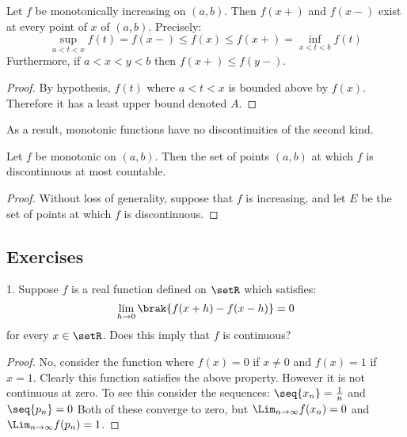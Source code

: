 \documentclass[12pt, letterpaper]{paper}
\begin{document}
\begin{theorem}
  \label{thr:4.29}
  Let $f$ be monotonically increasing on $(a,b)$. Then $f(x+)$ and
  $f(x-)$ exist at every point of $x$ of $(a,b)$. Precisely:
  \begin{equation*}
    \sup_{a<t<x}f(t) = f(x-)\leq f(x) \leq f(x+)= \inf_{x<t<b}f(t)
  \end{equation*}
  Furthermore, if $a < x < y < b$ then $f(x+)\leq f(y-)$.
  \begin{proof}
    By hypothesis, $f(t)$ where $a < t < x$ is bounded above by
    $f(x)$. Therefore it has a least upper bound denoted $A$.
  \end{proof}
\end{theorem}

As a result, monotonic functions have no discontinuities of the second
kind.

\begin{theorem}
  \label{thr:4.30}
  Let $f$ be monotonic on $(a,b)$. Then the set of points $(a,b)$ at
  which $f$ is discontinuous at most countable.

  \begin{proof}
    Without loss of generality, suppose that $f$ is increasing, and
    let $E$ be the set of points at which $f$ is discontinuous. 
  \end{proof}
\end{theorem}



\subsection{Exercises}

\begin{question}
  1. Suppose $f$ is a real function defined on $\setR$ which
  satisfies:
  \begin{equation*}
    \lim_{h\to 0} \brak{ f(x+h) - f(x-h)} = 0
  \end{equation*}
  for every $x \in \setR$. Does this imply that $f$ is continuous?
  \begin{proof}
    No, consider the function where $f(x) = 0$ if $x \neq 0$ and $f(x) =
    1$ if $x = 1$. Clearly this function satisfies the above
    property. However it is not continuous at zero. To see this
    consider the sequences: $\seq{x_n} = \frac{1}{n}$ and $\seq{p_n} =
    0$ Both of these converge to zero, but $\Lim_{n\to \infty}f(x_n) = 0$ and
    $\Lim_{n \to \infty}f(p_n) = 1$.
  \end{proof}
\end{question}
\end{document}
